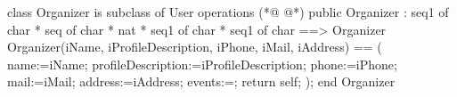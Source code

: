 \begin{vdmpp}[breaklines=true]
class Organizer  is subclass of User 
operations
(*@
\label{Organizer:3}
@*)
  public  Organizer : seq1 of char * seq of char * nat * seq1 of char * seq1 of char  ==> Organizer
  Organizer(iName, iProfileDescription, iPhone, iMail, iAddress) == (
   name:=iName;
   profileDescription:=iProfileDescription;
   phone:=iPhone;
   mail:=iMail;
   address:=iAddress;
   events:={};
   return self;
  );
end Organizer
\end{vdmpp}
